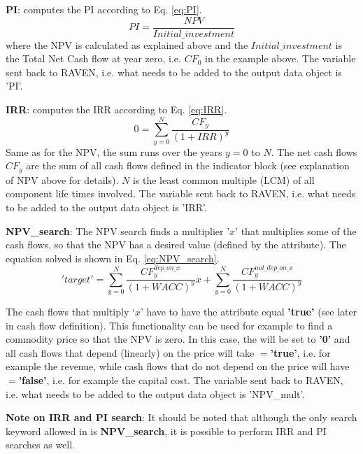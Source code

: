 \begin{enumerate}
\begin{enumerate}
\textbf{PI}: computes the PI according to Eq. \ref{eq:PI}. 
\begin{equation}\label{eq:PI}
PI=\frac{NPV}{Initial\_investment}
\end{equation}
where the NPV is calculated as explained above and the $Initial\_investment$ is the Total Net Cash flow at year zero, i.e. $CF_{0}$ in the example above.
The variable sent back to RAVEN, i.e. what needs to be added to the output data object is 'PI'.

\textbf{IRR}: computes the IRR according to Eq. \ref{eq:IRR}.
\begin{equation}\label{eq:IRR}
0=\sum_{y=0}^{N}\frac{CF_{y}}{(1+IRR)^{y}}
\end{equation}
Same as for the NPV, the sum runs over the years $y=0$ to $N$. The net cash flows $CF_{y}$ are the sum of all cash flows defined in the indicator block 
(see explanation of NPV above for details). $N$ is the least common multiple (LCM) of all component life times involved.
The variable sent back to RAVEN, i.e. what needs to be added to the output data object is 'IRR'.

\textbf{NPV\_search}: The NPV search finds a multiplier '$x$' that multiplies some of the cash flows, so that the NPV has a desired value (defined by the  attribute). The equation solved is shown in Eq. \ref{eq:NPV_search}.
\label{subsec:NPV_search}
\begin{equation}\label{eq:NPV_search}
'target'=\sum_{y=0}^{N}\frac{CF^{dep\_on\_x}_{y}}{(1+WACC)^{y}}x + \sum_{y=0}^{N}\frac{CF^{not\_dep\_on\_x}_{y}}{(1+WACC)^{y}}  
\end{equation}

The cash flows that multiply ‘$x$’ have to have the  attribute equal \textbf{'true'} (see later in cash flow definition). This functionality can be used for
 example to find a commodity price so that the NPV is zero. In this case, the  will be set to \textbf{'0'} and all cash flows that depend (linearly) on the price will take
 $=$\textbf{'true'}, i.e. for example the revenue, while cash flows that do not depend on the price will have $=$\textbf{'false'}, i.e. for example the capital cost.
The variable sent back to RAVEN, i.e. what needs to be added to the output data object is 'NPV\_mult'.

\textbf{Note on IRR and PI search}: It should be noted that although the only search keyword allowed in  is \textbf{NPV\_search}, it is possible to perform IRR and PI searches as well.


\end{enumerate}
\end{enumerate}
